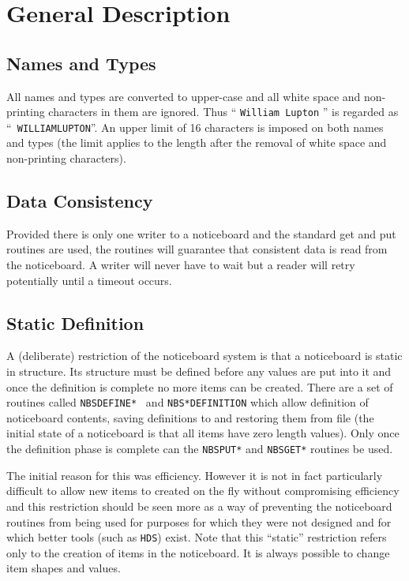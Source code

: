 \documentclass[twoside,11pt]{article}
\renewcommand{\_}{\texttt{\symbol{95}}}
\begin{document}
      \section {General Description}
      \subsection {Names and Types} All names and types are converted to
      upper-case and all white space and non-printing characters in them are
      ignored. Thus `` {\tt William Lupton} '' is regarded as ``{\tt%
WILLIAMLUPTON}''. An
      upper limit of 16 characters is imposed on both names and types (the
      limit applies to the length after the removal of white space and
      non-printing characters).

      \subsection {Data Consistency} Provided there is only one writer to a
      noticeboard and the standard get and put routines are used, the routines
      will guarantee that consistent data is read from the noticeboard. A
      writer will never have to wait but a reader will retry potentially until
      a timeout occurs.

      \subsection {Static Definition} A (deliberate) restriction of the
      noticeboard system is that a noticeboard is static in structure. Its
      structure must be defined before any values are put into it and once the
      definition is complete no more items can be created. There are a set of
      routines called {\tt NBS\_DEFINE\_* } and {\tt NBS\_*\_DEFINITION}
      which allow definition
      of noticeboard contents, saving definitions to and restoring them from
      file (the initial state of a noticeboard is that all items have zero
      length values). Only once the definition phase is complete can the
      {\tt NBS\_PUT\_*} and {\tt NBS\_GET\_*} routines be used.

      The initial reason for this was efficiency. However it is not in fact
      particularly difficult to allow new items to created on the fly without
      compromising efficiency and this restriction should be seen more as a way
      of preventing the noticeboard routines from being used for purposes for
      which they were not designed and for which better tools (such as
      {\tt HDS}) exist. Note that this ``static'' restriction refers only to  
      the creation of
      items in the noticeboard. It is always possible to change item shapes and
      values.
\end{document}
